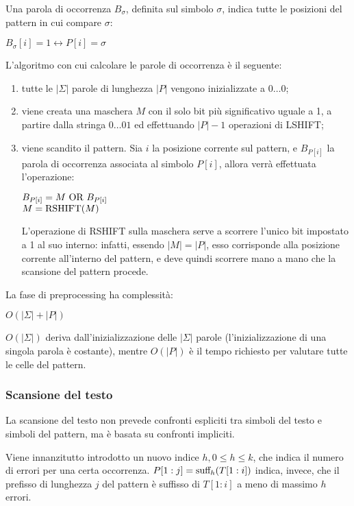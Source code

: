 Una parola di occorrenza $B_{\sigma}$, definita sul simbolo $\sigma$, indica tutte le posizioni del pattern in cui compare $\sigma$:
\begin{center}
    $B_{\sigma}[i] = 1 \longleftrightarrow P[i] = \sigma$
\end{center}
L'algoritmo con cui calcolare le parole di occorrenza è il seguente:
\begin{enumerate}
    \item tutte le $|\Sigma|$ parole di lunghezza $|P|$ vengono inizializzate a $0\ldots0$;
    \item viene creata una maschera $M$ con il solo bit più significativo uguale a 1, a partire dalla stringa $0\ldots01$ ed effettuando $|P| - 1$ operazioni di LSHIFT;
    \item viene scandito il pattern.
    Sia $i$ la posizione corrente sul pattern, e $B_{P[i]}$ la parola di occorrenza associata al simbolo $P[i]$, allora verrà effettuata l'operazione:
    \begin{center}
        $B_{P[i]} = M \textnormal{ OR } B_{P[i]}$\\
        $M = \textnormal{RSHIFT}(M)$
    \end{center}
    L'operazione di RSHIFT sulla maschera serve a scorrere l'unico bit impostato a 1 al suo interno: infatti, essendo $|M| = |P|$, esso corrisponde alla posizione corrente all'interno del pattern, e deve quindi scorrere mano a mano che la scansione del pattern procede.
\end{enumerate}
La fase di preprocessing ha complessità:
\begin{center}
    $O(|\Sigma| + |P|)$
\end{center}
$O(|\Sigma|)$ deriva dall'inizializzazione delle $|\Sigma|$ parole (l'inizializzazione di una singola parola è costante), mentre $O(|P|)$ è il tempo richiesto per valutare tutte le celle del pattern.

\subsubsection{Scansione del testo}
La scansione del testo non prevede confronti espliciti tra simboli del testo e simboli del pattern, ma è basata su confronti impliciti.

Viene innanzitutto introdotto un nuovo indice $h, 0 \le h \le k$, che indica il numero di errori per una certa occorrenza.
$P[1:j] = \textnormal{suff}_h(T[1:i])$ indica, invece, che il prefisso di lunghezza $j$ del pattern è suffisso di $T[1:i]$ a meno di massimo $h$ errori.

